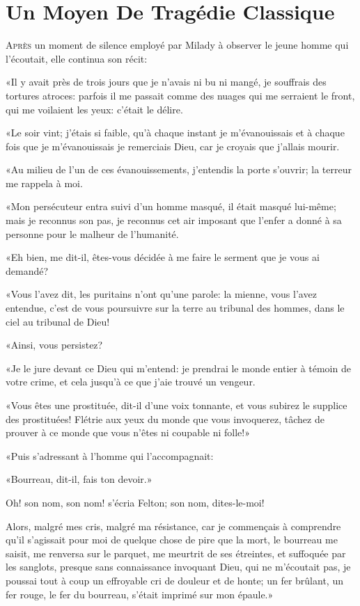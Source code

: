 
\chapter{Un Moyen De Tragédie Classique}

\lettrine{A}{près} un moment de silence employé par Milady à observer le jeune homme qui l'écoutait, elle continua son récit: 

\zz
«Il y avait près de trois jours que je n'avais ni bu ni mangé, je souffrais des tortures atroces: parfois il me passait comme des nuages qui me serraient le front, qui me voilaient les yeux: c'était le délire. 

«Le soir vint; j'étais si faible, qu'à chaque instant je m'évanouissais et à chaque fois que je m'évanouissais je remerciais Dieu, car je croyais que j'allais mourir. 

«Au milieu de l'un de ces évanouissements, j'entendis la porte s'ouvrir; la terreur me rappela à moi. 

«Mon persécuteur entra suivi d'un homme masqué, il était masqué lui-même; mais je reconnus son pas, je reconnus cet air imposant que l'enfer a donné à sa personne pour le malheur de l'humanité. 

«Eh bien, me dit-il, êtes-vous décidée à me faire le serment que je vous ai demandé? 

«Vous l'avez dit, les puritains n'ont qu'une parole: la mienne, vous l'avez entendue, c'est de vous poursuivre sur la terre au tribunal des hommes, dans le ciel au tribunal de Dieu! 

«Ainsi, vous persistez? 

«Je le jure devant ce Dieu qui m'entend: je prendrai le monde entier à témoin de votre crime, et cela jusqu'à ce que j'aie trouvé un vengeur. 

«Vous êtes une prostituée, dit-il d'une voix tonnante, et vous subirez le supplice des prostituées! Flétrie aux yeux du monde que vous invoquerez, tâchez de prouver à ce monde que vous n'êtes ni coupable ni folle!» 

«Puis s'adressant à l'homme qui l'accompagnait: 

«Bourreau, dit-il, fais ton devoir.» 

\speak  Oh! son nom, son nom! s'écria Felton; son nom, dites-le-moi! 

\speak  Alors, malgré mes cris, malgré ma résistance, car je commençais à comprendre qu'il s'agissait pour moi de quelque chose de pire que la mort, le bourreau me saisit, me renversa sur le parquet, me meurtrit de ses étreintes, et suffoquée par les sanglots, presque sans connaissance invoquant Dieu, qui ne m'écoutait pas, je poussai tout à coup un effroyable cri de douleur et de honte; un fer brûlant, un fer rouge, le fer du bourreau, s'était imprimé sur mon épaule.» 

